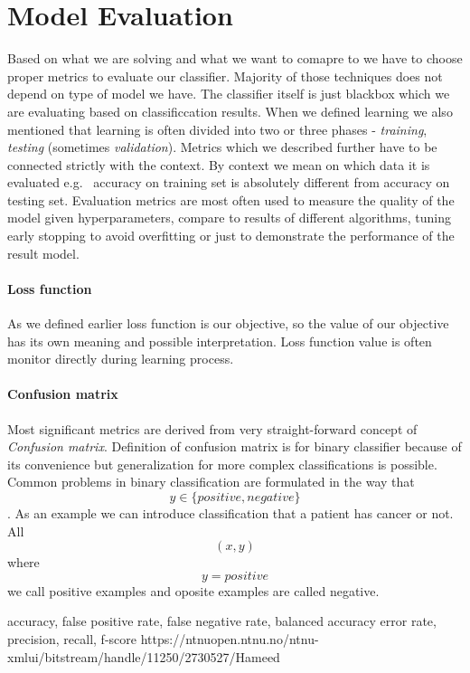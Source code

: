 \section{Model Evaluation}
Based on what we are solving and what we want to comapre to we have to choose proper metrics to evaluate our classifier. Majority of those techniques does not depend on type of model we have. The classifier itself is just blackbox which we are evaluating based on classificcation results.
When we defined learning we also mentioned that learning is often divided into two or three phases - \emph{training}, \emph{testing} (sometimes \emph{validation}). Metrics which we described further have to be connected strictly with the context. By context we mean on which data it is evaluated e.g. \ accuracy on training set is absolutely different from accuracy on testing set. 
Evaluation metrics are most often used to measure the quality of the model given hyperparameters, compare to results of different algorithms, tuning early stopping to avoid overfitting or just to demonstrate the performance of the result model.

\paragraph{Loss function}
As we defined earlier loss function is our objective, so the value of our objective has its own meaning and possible interpretation.  Loss function value is often monitor directly during learning process.

\paragraph{Confusion matrix}
Most significant metrics are derived from very straight-forward concept of \emph{Confusion matrix}. Definition of confusion matrix is for binary classifier because of its convenience but generalization for more complex classifications is possible. Common problems in binary classification are formulated in the way that $$y \in \{positive, negative\}$$. As an example we can introduce classification that a patient has cancer or not. All $$(x,y)$$ where $$y=positive$$ we call positive examples and oposite examples are called negative.

accuracy, false positive rate, false negative rate, balanced accuracy error rate, precision, recall, f-score
\cite{Hossin2015}
https://ntnuopen.ntnu.no/ntnu-xmlui/bitstream/handle/11250/2730527/Hameed%

